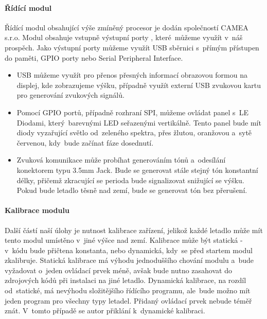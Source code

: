 			\paragraph{Řídící modul}
				Řídící modul obsahující výše zmíněný procesor je dodán společností CAMEA s.r.o. Modul obsahuje vstupně výstupní porty , které~můžeme využít v~náš prospěch. Jako výstupní porty můžeme využít USB sběrnici s~přímým přístupen do paměti, GPIO porty nebo Serial Peripheral Interface. 
				\begin{itemize}
					\item USB můžeme využít pro přenos přesných informací obrazovou formou na displej, kde zobrazujeme výšku, případně využít externí USB zvukovou kartu pro generování zvukových signálů. 
					
					\item Pomocí GPIO portů, případně rozhraní SPI, můžeme ovládat panel s~LE Diodami, který~barevnými LED seřazenými vertikálně. Tento panel bude mít diody vyzařující světlo od~zeleného spektra, přes žlutou, oranžovou a~sytě červenou, kdy~bude začínat fáze dosednutí.
					
					\item Zvuková komunikace může probíhat generováním tónů a~odesílání konektorem typu 3.5mm Jack. Bude se generovat stále stejný tón konstantní délky, přičemž zkracující se perioda bude signalizovat snižující se výšku. Pokud bude letadlo těsně nad zemí, bude se generovat tón bez přerušení.
				\end{itemize}
			
			\paragraph{Kalibrace modulu}
				Další částí naší úlohy je nutnost kalibrace zařízení, jelikož každé letadlo může mít tento modul umístěno v~jiné výšce nad zemí. Kalibrace může být statická - v~kódu bude přičtena konstanta, nebo dynamická, kdy~se před startem modul zkalibruje. Statická kalibrace má výhodu jednoduššího chování modulu a~bude vyžadovat o~jeden ovládací prvek méně, avšak bude nutno zasahovat do zdrojových kódů při instalaci na jiné letadlo. Dynamická kalibrace, na rozdíl od~statické, má nevýhodu složitějšího řídícího programu, ale~bude možno mít jeden program pro všechny typy letadel. Přidaný ovládací prvek nebude téměř znát. V~tomto případě se autor přiklání k~dynamické kalibraci.
				
